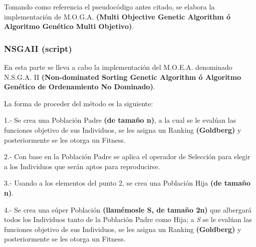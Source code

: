 \documentclass[letterpaper,10pt,english]{sphinxmanual}
\begin{document}
\begin{fulllineitems}
\label{Model/MOEA/MOGA:Model.MOEA.MOGA.execute_moea}
Tomando como referencia el pseudocódigo antes citado, se elabora la implementación
de M.O.G.A. \textbf{(Multi Objective Genetic Algorithm ó Algoritmo Genético Multi Objetivo)}.

\end{fulllineitems}



\subsubsection{NSGAII (script)}
\label{Model/MOEA/NSGAII:nsgaii-script}\label{Model/MOEA/NSGAII::doc}
En esta parte se lleva a cabo la implementación del M.O.E.A. denominado
N.S.G.A. II \textbf{(Non-dominated Sorting Genetic Algorithm ó Algoritmo Genético
de Ordenamiento No Dominado)}.

La forma de proceder del método es la siguiente:

1.- Se crea una Población Padre \textbf{(de tamaño n)}, a la cual se le evalúan las funciones objetivo de sus Individuos, se les asigna un Ranking \textbf{(Goldberg)}
y posteriormente se les otorga un Fitness.

2.- Con base en la Población Padre se aplica el operador de Selección para elegir a los Individuos que serán aptos para reproducirse.

3.- Usando a los elementos del punto 2, se crea una Población Hija \textbf{(de tamaño n)}.

4.- Se crea una súper Población \textbf{(llamémosle S, de tamaño 2n)} que albergará todos los Individuos tanto de la Población Padre como Hija; a \emph{S} se le evalúan las funciones objetivo de sus Individuos, se les asigna un Ranking \textbf{(Goldberg)} y posteriormente se les otorga un Fitness.
\end{document}
